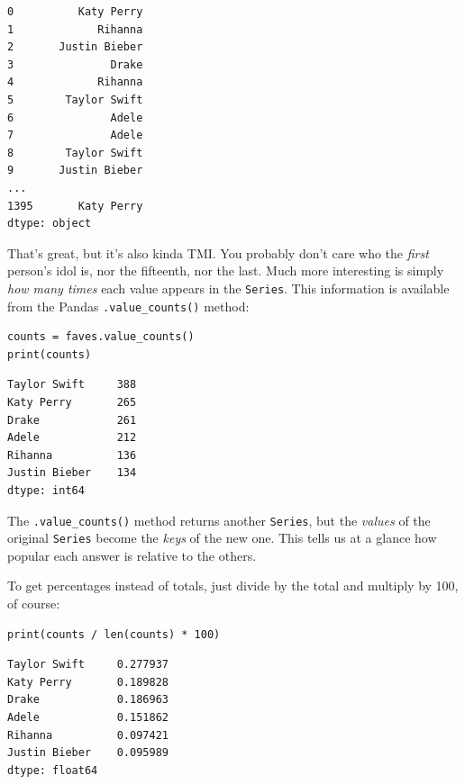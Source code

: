 \begin{Verbatim}[fontsize=\scriptsize,samepage=true,frame=leftline,framesep=5mm,framerule=1mm]
0          Katy Perry
1             Rihanna
2       Justin Bieber
3               Drake
4             Rihanna
5        Taylor Swift
6               Adele
7               Adele
8        Taylor Swift
9       Justin Bieber
...
1395       Katy Perry
dtype: object
\end{Verbatim}


That's great, but it's also kinda TMI. You probably don't care who the
\textit{first} person's idol is, nor the fifteenth, nor the last. Much more
interesting is simply \textit{how many times} each value appears in the
\texttt{Series}. This information is available from the Pandas
\texttt{.value\_counts()} method:

\begin{Verbatim}[fontsize=\small,samepage=true,frame=single,framesep=3mm]
counts = faves.value_counts()
print(counts)
\end{Verbatim}

\begin{Verbatim}[fontsize=\small,samepage=true,frame=leftline,framesep=5mm,framerule=1mm]
Taylor Swift     388
Katy Perry       265
Drake            261
Adele            212
Rihanna          136
Justin Bieber    134
dtype: int64
\end{Verbatim}

The \texttt{.value\_counts()} method returns another \texttt{Series}, but the
\textit{values} of the original \texttt{Series} become the \textit{keys} of the
new one. This tells us at a glance how popular each answer is relative to the
others.

To get percentages instead of totals, just divide by the total and multiply by
100, of course:

\begin{Verbatim}[fontsize=\small,samepage=true,frame=single,framesep=3mm]
print(counts / len(counts) * 100)
\end{Verbatim}

\begin{Verbatim}[fontsize=\small,samepage=true,frame=leftline,framesep=5mm,framerule=1mm]
Taylor Swift     0.277937
Katy Perry       0.189828
Drake            0.186963
Adele            0.151862
Rihanna          0.097421
Justin Bieber    0.095989
dtype: float64
\end{Verbatim}


